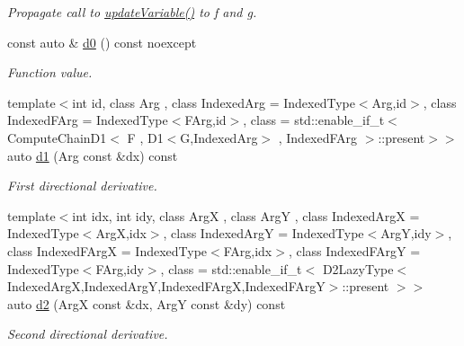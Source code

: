 \begin{DoxyCompactItemize}
\begin{DoxyCompactList}\small\item\em Propagate call to \hyperlink{structRFFGen_1_1MathematicalOperations_1_1Chain_a6b9577d631eb244c76d7b3d3f3d993d7}{update\-Variable()} to f and g. \end{DoxyCompactList}\item 
\hypertarget{structRFFGen_1_1MathematicalOperations_1_1Chain_aac13e9d28dc10dff07fa40c33b43309f}{const auto \& \hyperlink{structRFFGen_1_1MathematicalOperations_1_1Chain_aac13e9d28dc10dff07fa40c33b43309f}{d0} () const noexcept}\label{structRFFGen_1_1MathematicalOperations_1_1Chain_aac13e9d28dc10dff07fa40c33b43309f}

\begin{DoxyCompactList}\small\item\em Function value. \end{DoxyCompactList}\item 
{\footnotesize template$<$int id, class Arg , class Indexed\-Arg  = Indexed\-Type$<$\-Arg,id$>$, class Indexed\-F\-Arg  = Indexed\-Type$<$\-F\-Arg,id$>$, class  = std\-::enable\-\_\-if\-\_\-t$<$ Compute\-Chain\-D1$<$ F , D1$<$\-G,\-Indexed\-Arg$>$ , Indexed\-F\-Arg $>$\-::present$>$$>$ }\\auto \hyperlink{structRFFGen_1_1MathematicalOperations_1_1Chain_ac762868ce03eb3089f3cd1943062f9a2}{d1} (Arg const \&dx) const 
\begin{DoxyCompactList}\small\item\em First directional derivative. \end{DoxyCompactList}\item 
{\footnotesize template$<$int idx, int idy, class Arg\-X , class Arg\-Y , class Indexed\-Arg\-X  = Indexed\-Type$<$\-Arg\-X,idx$>$, class Indexed\-Arg\-Y  = Indexed\-Type$<$\-Arg\-Y,idy$>$, class Indexed\-F\-Arg\-X  = Indexed\-Type$<$\-F\-Arg,idx$>$, class Indexed\-F\-Arg\-Y  = Indexed\-Type$<$\-F\-Arg,idy$>$, class  = std\-::enable\-\_\-if\-\_\-t$<$ D2\-Lazy\-Type$<$\-Indexed\-Arg\-X,\-Indexed\-Arg\-Y,\-Indexed\-F\-Arg\-X,\-Indexed\-F\-Arg\-Y$>$\-::present $>$$>$ }\\auto \hyperlink{structRFFGen_1_1MathematicalOperations_1_1Chain_ad1fd27be6286cadf63fff93595b83c46}{d2} (Arg\-X const \&dx, Arg\-Y const \&dy) const 
\begin{DoxyCompactList}\small\item\em Second directional derivative. \end{DoxyCompactList}\item 

\end{DoxyCompactItemize}
